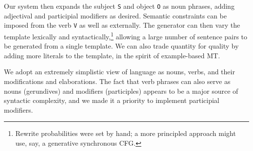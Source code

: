 \noindent Our system then expands the subject {\small \tt S} and object {\small \tt O} as noun phrases, adding adjectival and participial modifiers as desired. 
Semantic constraints can be imposed from the verb {\small \tt V} as well as externally.
The generator can then vary the template lexically and syntactically,\footnote{\label{footnote:probabilities}
    Rewrite probabilities were set by hand; a more principled approach might use, say, a generative synchronous CFG.} allowing a large number of sentence pairs to be generated from a single template.
We can also trade quantity for quality by adding more literals to the template, in the spirit of example-based MT.





We adopt an extremely simplistic view of language as nouns, verbs, and their modifications and elaborations.
The fact that verb phrases can also serve as nouns (gerundives) and modifiers (participles) appears to be a major source of syntactic complexity, and we made it a priority to implement participial modifiers.

